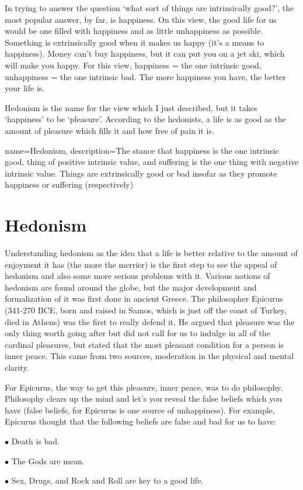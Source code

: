 In trying to answer the question ‘what sort of things are intrinsically good?’, the most popular answer, by far, is happiness. On this view, the good life for us would be one filled with happiness and as little unhappiness as possible. Something is extrinsically good when it makes us happy (it’s a means to happiness). Money can’t buy happiness, but it can put you on a jet ski, which will make you happy. For this view, happiness = the one intrinsic good, unhappiness = the one intrinsic bad. The more happiness you have, the better your life is.

\gls{Hedonism} is the name for the view which I just described, but it takes ‘happiness’ to be ‘pleasure’. According to the hedonists, a life is as good as the amount of pleasure which fills it and how free of pain it is. 

{
  name=Hedonism,
  description={The stance that happiness is the one intrinsic good, thing of positive intrinsic value, and suffering is the one thing with negative intrinsic value. Things are extrinsically good or bad insofar as they promote happiness or suffering (respectively)}
}


\section{Hedonism}

Understanding hedonism as the idea that a life is better relative to the amount of enjoyment it has (the more the merrier) is the first step to see the appeal of hedonism and also some more serious problems with it. Various notions of hedonism are found around the globe, but the major development and formalization of it was first done in ancient Greece. The philosopher Epicurus (341-270 BCE, born and raised in Samos, which is just off the coast of Turkey, died in Athens) was the first to really defend it. He argued that pleasure was the only thing worth going after but did not call for us to indulge in all of the cardinal pleasures, but stated that the most pleasant condition for a person is inner peace. This came from two sources, moderation in the physical and mental clarity.

For Epicurus, the way to get this pleasure, inner peace, was to do philosophy. Philosophy clears up the mind and let’s you reveal the false beliefs which you have (false beliefs, for Epicurus is one source of unhappiness). For example, Epicurus thought that the following beliefs are false and bad for us to have:
\begin{earg}
    \item[$\bullet$] Death is bad.
    \item[$\bullet$] The Gods are mean.
    \item[$\bullet$] Sex, Drugs, and Rock and Roll are key to a good life.
\end{earg}

